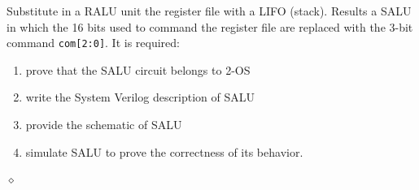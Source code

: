 \begin{problem}\label{lb:salu}

Substitute in a RALU unit the register file with a LIFO (stack). Results a SALU in which the 16 bits used to command the register file are replaced with the 3-bit command {\tt com[2:0]}. It is required:
\begin{enumerate}
    \item prove that the SALU circuit belongs to 2-OS
    \item write the System Verilog description of SALU
    \item provide the schematic of SALU
    \item simulate SALU to prove the correctness of its behavior.
\end{enumerate}

$\diamond$
\end{problem}